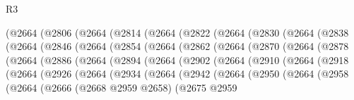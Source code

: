 \begin{lexlean}{R3}
\begin{coremodule}
    (@2664
      (@2806
        (@2664
          (@2814
            (@2664
              (@2822
                (@2664
                  (@2830
                    (@2664
                      (@2838
                        (@2664
                          (@2846
                            (@2664
                              (@2854
                                (@2664
                                  (@2862
                                    (@2664
                                      (@2870
                                        (@2664
                                          (@2878
                                            (@2664
                                              (@2886
                                                (@2664
                                                  (@2894
                                                    (@2664
                                                      (@2902
                                                        (@2664
                                                          (@2910
                                                            (@2664
                                                              (@2918
                                                                (@2664
                                                                  (@2926
                                                                    (@2664
                                                                      (@2934
                                                                        (@2664
                                                                          (@2942
                                                                            (@2664
                                                                              (@2950
                                                                                (@2664
                                                                                  (@2958
                                                                                    (@2664
                                                                                      (@2666
                                                                                        (@2668
                                                                                          @2959
                                                                                          @2658)
                                                                                        (@2675
                                                                                          @2959

\end{coremodule}
\end{lexlean}
